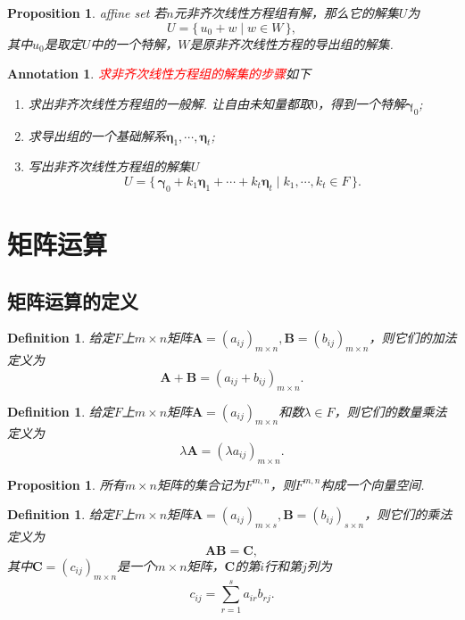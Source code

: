 \documentclass{article}
\newtheorem{proposition}[theorem]{Proposition}
\newtheorem{definition}[theorem]{Definition}
\newtheorem{annotation}[theorem]{Annotation}
\newcommand\Set[2]{\{\,#1\mid#2\,\}} %
\newcommand{\mbf}[1]{\bm{#1}}
\newcommand{\redt}[1]{\textcolor{red}{#1}}
\begin{document}
\begin{proposition}
\rm {\color{red} affine set} 若$n$元非齐次线性方程组有解，那么它的解集$U$为
$$
U = \Set{u_0 + w}{ w \in W},
$$
其中$u_0$是取定$U$中的一个特解，$W$是原非齐次线性方程的导出组的解集. 
\end{proposition}

\begin{annotation}
\rm \redt{求非齐次线性方程组的解集的步骤}如下
\begin{enumerate}
	\item 求出非齐次线性方程组的一般解. 让自由未知量都取$0$，得到一个特解$\mbf{\gamma}_0$;
	\item 求导出组的一个基础解系$\mbf{\eta}_1,\cdots,\mbf{\eta}_t$;
	\item 写出非齐次线性方程组的解集$U$
	$$
	U = \Set{\mbf{\gamma}_0+k_1\mbf{\eta}_1+\cdots+k_t\mbf{\eta}_t}{k_1,\cdots,k_t \in F}.
	$$
\end{enumerate}
\end{annotation}
\newpage
\section{矩阵运算}



\subsection{矩阵运算的定义}

\begin{definition}
\rm 给定$F$上$m \times n$矩阵$\mbf{A}=(a_{ij})_{m \times n},\mbf{B}=(b_{ij})_{m \times n}$，则它们的加法定义为
$$
\mbf{A} + \mbf{B} = (a_{ij} + b_{ij})_{m \times n}.
$$
\end{definition}

\begin{definition}
\rm 给定$F$上$m\times n$矩阵$\mbf{A}=(a_{ij})_{m \times n}$和数$\lambda \in F$，则它们的数量乘法定义为
$$
\lambda\mbf{A} = (\lambda a_{ij})_{m \times n}.
$$
\end{definition}


\begin{proposition}
\rm 所有$m \times n$矩阵的集合记为$F^{m,n}$，则$F^{m,n}$构成一个向量空间.
\end{proposition}

\begin{definition}
\rm 给定$F$上$m \times n$矩阵$\mbf{A}=(a_{ij})_{m \times s},\mbf{B}=(b_{ij})_{s \times n}$，则它们的乘法定义为
$$
\mbf{A}\mbf{B} = \mbf{C},
$$
其中$\mbf{C}=(c_{ij})_{m\times n}$是一个$m \times n$矩阵，$\mbf{C}$的第$i$行和第$j$列为
$$
c_{ij} = \sum\limits_{r=1}^{s} a_{ir}b_{rj}. 
$$
\end{definition}
\end{document}
